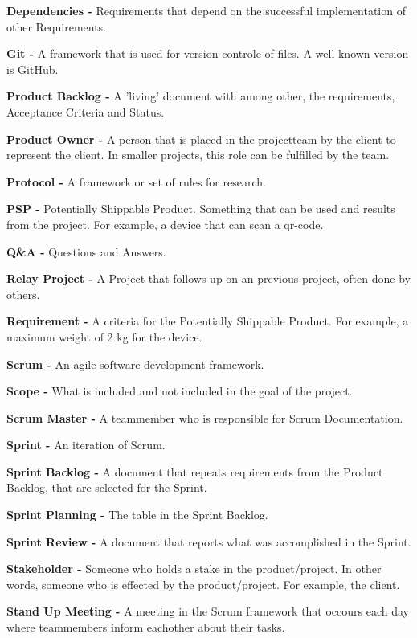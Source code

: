 \documentclass[10pt]{report}
\begin{document}
\noindent\textbf{Dependencies -} Requirements that depend on the successful implementation of other Requirements.

\noindent\textbf{Git -} A framework that is used for version controle of files. A well known version is GitHub.

\noindent\textbf{Product Backlog -} A 'living' document with among other, the requirements, Acceptance Criteria and Status.

\noindent\textbf{Product Owner -} A person that is placed in the projectteam by the client to represent the client. In smaller projects, this role can be fulfilled by the team.

\noindent\textbf{Protocol -} A framework or set of rules for research.

\noindent\textbf{PSP -} Potentially Shippable Product. Something that can be used and results from the project. For example, a device that can scan a qr-code.

\noindent\textbf{Q\&A -} Questions and Answers.

\noindent\textbf{Relay Project -} A Project that follows up on an previous project, often done by others.

\noindent\textbf{Requirement -} A criteria for the Potentially Shippable Product. For example, a maximum weight of 2 kg for the device.

\noindent\textbf{Scrum -} An agile software development framework.

\noindent\textbf{Scope -} What is included and not included in the goal of the project.

\noindent\textbf{Scrum Master -} A teammember who is responsible for Scrum Documentation.

\noindent\textbf{Sprint -} An iteration of Scrum.

\noindent\textbf{Sprint Backlog -} A document that repeats requirements from the Product Backlog, that are selected for the Sprint.

\noindent\textbf{Sprint Planning -} The table in the Sprint Backlog.

\noindent\textbf{Sprint Review -} A document that reports what was accomplished in the Sprint.

\noindent\textbf{Stakeholder -} Someone who holds a stake in the product/project. In other words, someone who is effected by the product/project. For example, the client.

\noindent\textbf{Stand Up Meeting -} A meeting in the Scrum framework that occours each day where teammembers inform eachother about their tasks.
\end{document}
